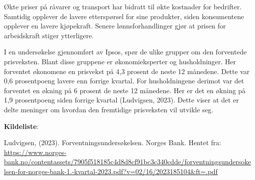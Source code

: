 \documentclass[
  letterpaper,
  DIV=11,
  numbers=noendperiod]{scrartcl}
\begin{document}
Økte priser på råvarer og transport har bidratt til økte kostnader for
bedrifter. Samtidig opplever de lavere etterspørsel for sine produkter,
siden konsumentene opplever en lavere kjøpekraft. Senere
lønnsforhandlinger gjør at prisen for arbeidskraft stiger ytterligere.

I en undersøkelse gjennomført av Ipsos, spør de ulike grupper om den
forventede prisveksten. Blant disse gruppene er økonomieksperter og
husholdninger. Her forventet økonomene en prisvekst på 4,3 prosent de
neste 12 månedene. Dette var 0,6 prosentpoeng lavere enn forrige
kvartal. For husholdningene derimot var det forventet en økning på 6
prosent de neste 12 månedene. Her er det en økning på 1,9 prosentpoeng
siden forrige kvartal (Ludvigsen, 2023). Dette viser at det er delte
meninger om hvordan den fremtidige prisveksten vil utvikle seg.

\textbf{Kildeliste}:

Ludvigsen, (2023). Forventningsundersøkelsen. Norges Bank. Hentet fra:
\href{https://www.norges-bank.no/contentassets/7905f518185c4d8d8cf91bc3c340cdde/forventningsundersokelsen-for-norges-bank-1.-kvartal-2023.pdf?v=02\%2F16\%2F2023185104\&ft=.pdf\&fbclid=IwAR1XIlF3_PgeJVznmS9dRjSK8gqkRlow4pYafmM8VhM7mLsFYRYC5D0qs0I}{https://www.norges-bank.no/contentassets/7905f518185c4d8d8cf91bc3c340cdde/forventningsundersokelsen-for-norges-bank-1.-kvartal-2023.pdf?v=02/16/2023185104\&ft=.pdf}
\end{document}
